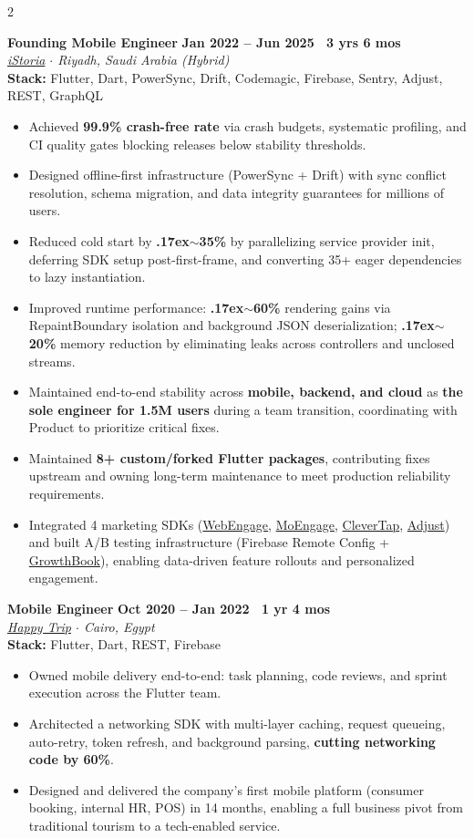 \documentclass[10pt,a4paper]{article}
\newcommand{\workexp}[5]{
    \noindent \textbf{#1} \hfill \textbf{#2} \\
    \textit{#3} \\
    {\small\color{techstack}\textbf{Stack:} #4}
    \vspace{0pt}
    \begin{itemize}[noitemsep,topsep=0pt,leftmargin=1.5em]
    #5
    \end{itemize}
    \vspace{1pt}
}
\begin{document}
\begin{paracol}{2}
        \workexp{Founding Mobile Engineer}{Jan 2022 -- Jun 2025 \textbullet\ 3 yrs 6 mos}
        {\href{https://istoria.app/en/}{iStoria} $\cdot$ Riyadh, Saudi Arabia (Hybrid)}
        {Flutter, Dart, PowerSync, Drift, Codemagic, Firebase, Sentry, Adjust, REST, GraphQL}
        {
            \item Achieved \textbf{99.9\% crash-free rate} via crash budgets, systematic profiling, and CI quality gates blocking releases below stability thresholds.
        \item Designed offline-first infrastructure (PowerSync + Drift) with sync conflict resolution, schema migration, and data integrity guarantees for millions of users.
        \item Reduced cold start by \textbf{{\raise.17ex\hbox{$\scriptstyle\sim$}}35\%} by parallelizing service provider init, deferring SDK setup post-first-frame, and converting 35+ eager dependencies to lazy instantiation.
        \item Improved runtime performance: \textbf{{\raise.17ex\hbox{$\scriptstyle\sim$}}60\%} rendering gains via RepaintBoundary isolation and background JSON deserialization; \textbf{{\raise.17ex\hbox{$\scriptstyle\sim$}}20\%} memory reduction by eliminating leaks across controllers and unclosed streams.
        \item Maintained end-to-end stability across \textbf{mobile, backend, and cloud} as \textbf{the sole engineer for 1.5M users} during a team transition, coordinating with Product to prioritize critical fixes.
        \item Maintained \textbf{8+ custom/forked Flutter packages}, contributing fixes upstream and owning long-term maintenance to meet production reliability requirements.
        \item Integrated 4 marketing SDKs (\href{https://webengage.com/}{WebEngage}, \href{https://www.moengage.com/}{MoEngage}, \href{https://clevertap.com/}{CleverTap}, \href{https://www.adjust.com/}{Adjust}) and built A/B testing infrastructure (Firebase Remote Config + \href{https://www.growthbook.io/}{GrowthBook}), enabling data-driven feature rollouts and personalized engagement.
        }

        \workexp{Mobile Engineer}{Oct 2020 -- Jan 2022 \textbullet\ 1 yr 4 mos}
        {\href{https://www.linkedin.com/company/happytrip-ar}{Happy Trip} $\cdot$ Cairo, Egypt}
        {Flutter, Dart, REST, Firebase}
        {
            \item Owned mobile delivery end-to-end: task planning, code reviews, and sprint execution across the Flutter team.
        \item Architected a networking SDK with multi-layer caching, request queueing, auto-retry, token refresh, and background parsing, \textbf{cutting networking code by 60\%}.
        \item Designed and delivered the company's first mobile platform (consumer booking, internal HR, POS) in 14 months, enabling a full business pivot from traditional tourism to a tech-enabled service.
        }


\end{paracol}
\end{document}
